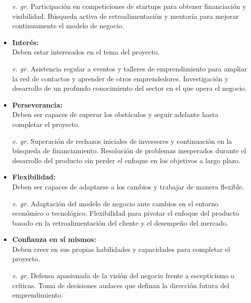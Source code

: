 \begin{itemize}
\begin{itemize}
        \item[\textit{e. gr.}]Participación en competiciones de startups para obtener financiación y visibilidad. Búsqueda activa de retroalimentación y mentoría para mejorar continuamente el modelo de negocio.
        \item \textbf{Interés:}\\
        Deben estar interesados en el tema del proyecto.
        \item[\textit{e. gr.}] Asistencia regular a eventos y talleres de emprendimiento para ampliar la red de contactos y aprender de otros emprendedores. Investigación y desarrollo de un profundo conocimiento del sector en el que opera el negocio.
       \item \textbf{Perseverancia: }\\
       Deben ser capaces de superar los obstáculos y seguir adelante hasta completar el proyecto.
       \item[\textit{e. gr.}] Superación de rechazos iniciales de inversores y continuación en la búsqueda de financiamiento. Resolución de problemas inesperados durante el desarrollo del producto sin perder el enfoque en los objetivos a largo plazo.
      \item \textbf{Flexibilidad: } \\
      Deben ser capaces de adaptarse a los cambios y trabajar de manera flexible.
      \item[\textit{e. gr.}] Adaptación del modelo de negocio ante cambios en el entorno económico o tecnológico. Flexibilidad para pivotar el enfoque del producto basado en la retroalimentación del cliente y el desempeño del mercado.
      \item \textbf{Confianza en sí mismos:}\\
      Deben creer en sus propias habilidades y capacidades para completar el proyecto.
      \item[\textit{e. gr.}]
      Defensa apasionada de la visión del negocio frente a escepticismo o críticas. Toma de decisiones audaces que definan la dirección futura del emprendimiento.
    \end{itemize}
\end{itemize}



\newpage

